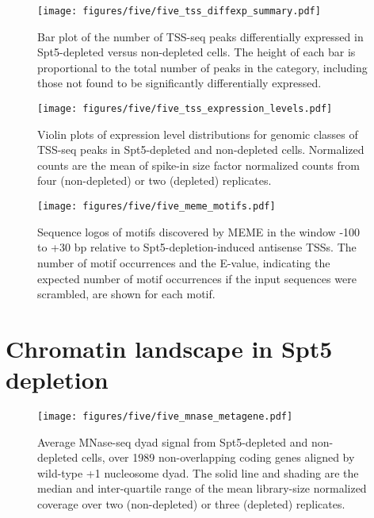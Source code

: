 \begin{figure}[h]
    \centering
    \begin{minipage}[t]{2.875in}
        \centering
        \texttt{[image: figures/five/five\_tss\_diffexp\_summary.pdf]}
        \caption[Bar plot of the number of TSS-seq peaks in various genomic classes differentially expressed in Spt5 depleted versus non-depleted cells.]{Bar plot of the number of TSS-seq peaks differentially expressed in Spt5-depleted versus non-depleted cells. The height of each bar is proportional to the total number of peaks in the category, including those not found to be significantly differentially expressed.}
        \label{fig:five_tss_diffexp_summary}
    \end{minipage}\hfill
    \begin{minipage}[t]{2.875in}
        \centering
        \texttt{[image: figures/five/five\_tss\_expression\_levels.pdf]}
        \caption[Violin plots of expression level distributions for genomic classes of TSS-seq peaks in Spt5-depleted and non-depleted cells.]{Violin plots of expression level distributions for genomic classes of TSS-seq peaks in Spt5-depleted and non-depleted cells. Normalized counts are the mean of spike-in size factor normalized counts from four (non-depleted) or two (depleted) replicates.}
        \label{fig:five_tss_expression_levels}
    \end{minipage}
\end{figure}

\begin{figure}[h]
    \centering
    \texttt{[image: figures/five/five\_meme\_motifs.pdf]}
    \caption[Sequence logos of motifs discovered by MEME upstream of Spt5-depletion-induced antisense TSSs.]{Sequence logos of motifs discovered by MEME \citep{bailey2015} in the window -100 to +30 bp relative to Spt5-depletion-induced antisense TSSs. The number of motif occurrences and the E-value, indicating the expected number of motif occurrences if the input sequences were scrambled, are shown for each motif.}
    \label{fig:five_meme_motifs}
\end{figure}

\clearpage

\section{Chromatin landscape in Spt5 depletion}

\begin{wrapfigure}[15]{r}{3in}
    \texttt{[image: figures/five/five\_mnase\_metagene.pdf]}
    \caption[Average MNase-seq dyad signal from Spt5 depleted and non-depleted cells, over non-overlapping coding genes.]{Average MNase-seq dyad signal from Spt5-depleted and non-depleted cells, over 1989 non-overlapping coding genes aligned by wild-type +1 nucleosome dyad. The solid line and shading are the median and inter-quartile range of the mean library-size normalized coverage over two (non-depleted) or three (depleted) replicates.}
    \label{fig:five_mnase_metagene}
\end{wrapfigure}

